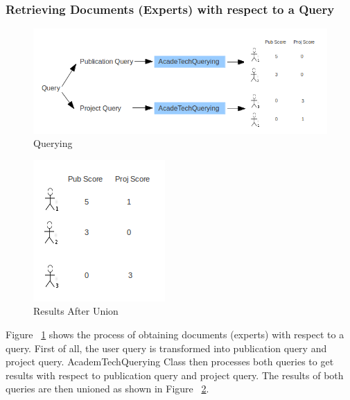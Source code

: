 \subsubsection{Retrieving Documents (Experts) with respect to a Query} \label{section:union}

\begin{figure}
\centering
\includegraphics[scale=0.7]{./figures/querying.png}
\caption{Querying} \label{fig:quering} 
\end{figure}
\quad
\begin{figure}
\centering
\includegraphics[scale=0.7]{./figures/union.png}
\caption{Results After Union} \label{fig:union} 
\end{figure}
Figure ~\ref{fig:quering} shows the process of obtaining documents (experts) with respect to a query. 
First of all, the user query is transformed into publication query and project
query. AcademTechQuerying Class then processes both queries to get results with respect to publication query and project query. The results of both
queries are then unioned as shown in Figure ~\ref{fig:union}.

